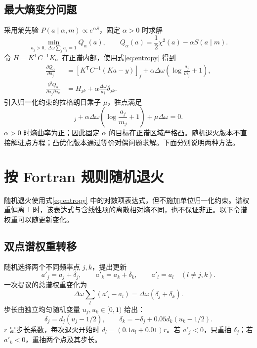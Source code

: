 \documentclass[UTF8,fontset=fandol,11pt]{ctexart}
\begin{document}
\subsection{最大熵变分问题}
采用熵先验 $P(a\mid\alpha,m)\propto e^{\alpha S}$，固定 $\alpha>0$ 时求解
\begin{equation}
    \min_{a_j>0,\;\Delta\omega\sum_j a_j=1}Q_\alpha(a),\qquad Q_\alpha(a)=\frac12\chi^2(a)-\alpha S(a\mid m).
    \label{eq:objective}
\end{equation}
令 $H=K^{\mathsf T}C^{-1}K$。在正谱内部，使用式\eqref{eq:entropy} 得到
\begin{align}
    \frac{\partial Q_\alpha}{\partial a_j}&=[K^{\mathsf T}C^{-1}(Ka-y)]_j+\alpha\Delta\omega\left(\log\frac{a_j}{m_j}+1\right),\\
    \frac{\partial^2 Q_\alpha}{\partial a_j\partial a_k}&=H_{jk}+\alpha\frac{\Delta\omega}{a_j}\delta_{jk}.
\end{align}
引入归一化约束的拉格朗日乘子 $\mu$，驻点满足
\begin{equation}
    [K^{\mathsf T}C^{-1}(Ka-y)]_j+\alpha\Delta\omega\left(\log\frac{a_j}{m_j}+1\right)+\mu\Delta\omega=0.
\end{equation}
$\alpha>0$ 时熵曲率为正；因此固定 $\alpha$ 的目标在正谱区域严格凸。随机退火版本不直接解驻点方程；凸优化版本通过等价对偶问题求解。下面分别说明两种方法。

\section{按 Fortran 规则随机退火}
随机退火使用式\eqref{eq:entropy} 中的对数项表达式，但不施加单位归一化约束。谱权重偏离 1 时，该表达式与含线性项的离散相对熵不同，也不保证非正。以下令谱权重可以随更新变化。
\subsection{双点谱权重转移}
随机选择两个不同频率点 $j,k$，提出更新
\begin{equation}
    a'_j=a_j+\delta_j,\qquad a'_k=a_k+\delta_k,\qquad a'_l=a_l\quad(l\ne j,k).
\end{equation}
一次提议的总谱权重变化为
\begin{equation}
    \Delta\omega\sum_l(a'_l-a_l)=\Delta\omega(\delta_j+\delta_k).
\end{equation}
步长由独立均匀随机变量 $u_j,u_k\in[0,1)$ 给出：
\begin{equation}
    \delta_j=d_j(u_j-1/2),\qquad \delta_k=-\delta_j+0.05d_k(u_k-1/2).
\end{equation}
$r$ 是步长系数，每次退火开始时 $d_l=(0.1a_l+0.01)r$。若 $a'_j<0$，只重抽 $\delta_j$；若 $a'_k<0$，重抽两个点及其步长。
\end{document}

